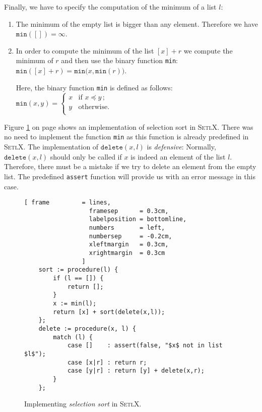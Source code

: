 Finally, we have to specify the computation of the minimum of a list $l$:
\begin{enumerate}
\item The minimum of the empty list is bigger than any element.  Therefore we have 
      \\[0.2cm]
      \hspace*{1.3cm} $\mathtt{min}([]) = \infty$.
\item In order to compute the minimum of the list $[x] + r$ we compute the minimum of $r$ and
      then use the binary function \texttt{min}: \\[0.2cm]
      \hspace*{1.3cm} 
      $\mathtt{min}([x] + r) = \mathtt{min}\bigl(x, \mathtt{min}(r) \bigr)$. 

      Here, the binary function \texttt{min} is defined as follows: \\[0.2cm]
      \hspace*{1.3cm} 
      $\mathtt{min}(x,y) = \left\{
      \begin{array}{ll}
        x  & \mbox{if $x \preceq y\,$;} \\
        y  & \mbox{otherwise.} \\
      \end{array}\right.
      $
\end{enumerate}
Figure \ref{fig:selection-sort.setlx} on page \pageref{fig:selection-sort.setlx} shows an
implementation of selection sort in \textsc{SetlX}.  There was no need to implement the function \texttt{min} as this function is already predefined in \textsc{SetlX}.
The implementation of $\mathtt{delete}(x,l)$ is \emph{defensive}:  Normally, $\mathtt{delete}(x, l)$
should only be called if $x$ is indeed an element of the list $l$.   Therefore, there must be
a mistake if we try to delete an element from the empty list.  The predefined \texttt{assert}
function will provide us with an error message in this case.


\begin{figure}[!ht]
  \centering
\begin{Verbatim}[ frame         = lines, 
                  framesep      = 0.3cm, 
                  labelposition = bottomline,
                  numbers       = left,
                  numbersep     = -0.2cm,
                  xleftmargin   = 0.3cm,
                  xrightmargin  = 0.3cm
                ]
    sort := procedure(l) {
        if (l == []) {
            return [];
        }
        x := min(l);
        return [x] + sort(delete(x,l));
    };   
    delete := procedure(x, l) {
        match (l) {
            case []    : assert(false, "$x$ not in list $l$");
            case [x|r] : return r;
            case [y|r] : return [y] + delete(x,r);
        }
    };
\end{Verbatim}
\vspace*{-0.3cm}
  \caption{Implementing \emph{selection sort} in \textsc{SetlX}.}
  \label{fig:selection-sort.setlx}
\end{figure}

